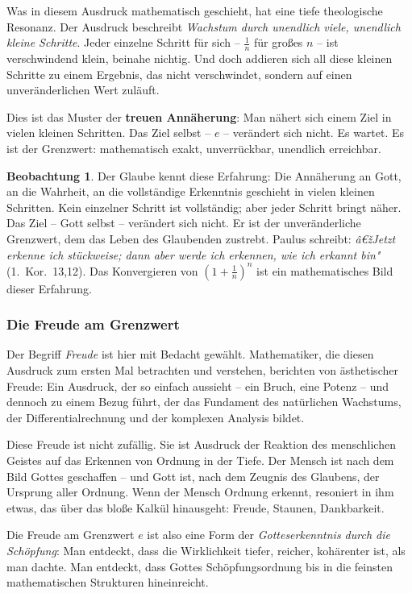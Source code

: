 ﻿\documentclass[a4paper,12pt]{article}
\theoremstyle{definition}
\newtheorem{observation}{Beobachtung}[section]
\begin{document}
Was in diesem Ausdruck mathematisch geschieht, hat eine tiefe theologische Resonanz.
Der Ausdruck beschreibt \textit{Wachstum durch unendlich viele, unendlich kleine
	Schritte}. Jeder einzelne Schritt für sich -- $\frac{1}{n}$ für großes $n$ -- ist
verschwindend klein, beinahe nichtig. Und doch addieren sich all diese kleinen
Schritte zu einem Ergebnis, das nicht verschwindet, sondern auf einen unveränderlichen
Wert zuläuft.

Dies ist das Muster der \textbf{treuen Annäherung}: Man nähert sich einem Ziel
in vielen kleinen Schritten. Das Ziel selbst -- $e$ -- verändert sich nicht.
Es wartet. Es ist der Grenzwert: mathematisch exakt, unverrückbar, unendlich
erreichbar.

\begin{observation}
	Der Glaube kennt diese Erfahrung: Die Annäherung an Gott, an die Wahrheit,
	an die vollständige Erkenntnis geschieht in vielen kleinen Schritten. Kein
	einzelner Schritt ist vollständig; aber jeder Schritt bringt näher. Das Ziel --
	Gott selbst -- verändert sich nicht. Er ist der unveränderliche Grenzwert, dem
	das Leben des Glaubenden zustrebt. Paulus schreibt: \textit{â€žJetzt erkenne ich
		stückweise; dann aber werde ich erkennen, wie ich erkannt bin"} (1.~Kor.~13,12).
	Das Konvergieren von $\left(1+\frac{1}{n}\right)^n$ ist ein mathematisches Bild
	dieser Erfahrung.
\end{observation}

\subsubsection{Die Freude am Grenzwert}

Der Begriff \textit{Freude} ist hier mit Bedacht gewählt. Mathematiker, die diesen
Ausdruck zum ersten Mal betrachten und verstehen, berichten von ästhetischer Freude:
Ein Ausdruck, der so einfach aussieht -- ein Bruch, eine Potenz -- und dennoch
zu einem Bezug führt, der das Fundament des natürlichen
Wachstums, der Differentialrechnung und der komplexen Analysis bildet.

Diese Freude ist nicht zufällig. Sie ist Ausdruck der Reaktion des menschlichen
Geistes auf das Erkennen von Ordnung in der Tiefe. Der Mensch ist nach dem Bild
Gottes geschaffen -- und Gott ist, nach dem Zeugnis des Glaubens, der Ursprung
aller Ordnung. Wenn der Mensch Ordnung erkennt, resoniert in ihm etwas, das über
das bloße Kalkül hinausgeht: Freude, Staunen, Dankbarkeit.

Die Freude am Grenzwert $e$ ist also eine Form der \textit{Gotteserkenntnis durch
	die Schöpfung}: Man entdeckt, dass die Wirklichkeit tiefer, reicher, kohärenter
ist, als man dachte. Man entdeckt, dass Gottes Schöpfungsordnung bis in die feinsten
mathematischen Strukturen hineinreicht.
\end{document}
